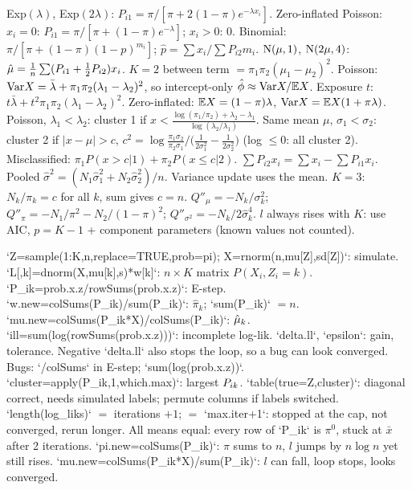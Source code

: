 \li Exp$(\lambda)$, Exp$(2\lambda)$: $P_{i1}=\pi/[\pi+2(1-\pi)e^{-\lambda x_i}]$.
\li Zero-inflated Poisson: $x_i=0$: $P_{i1}=\pi/[\pi+(1-\pi)e^{-\lambda}]$; $x_i>0$: 0. Binomial: $\pi/[\pi+(1-\pi)(1-p)^{m_i}]$; $\hat p=\sum x_i/\sum P_{i2}m_i$.
\li $\mathrm{N}(\mu,1)$, $\mathrm{N}(2\mu,4)$: $\hat{\mu}=\frac1n\sum(P_{i1}+\frac12P_{i2})x_i$.
\sk{} $K=2$ between term $=\pi_1\pi_2(\mu_1-\mu_2)^2$. Poisson: $\mathrm{Var} X=\bar\lambda+\pi_1\pi_2(\lambda_1-\lambda_2)^2$, so intercept-only $\hat{\phi}\approx\mathrm{Var} X/\mathbb{E} X$. Exposure $t$: $t\bar\lambda+t^2\pi_1\pi_2(\lambda_1-\lambda_2)^2$. Zero-inflated: $\mathbb{E} X=(1-\pi)\lambda$, $\mathrm{Var} X=\mathbb{E} X(1+\pi\lambda)$.
\sk{} Poisson, $\lambda_1<\lambda_2$: cluster 1 if $x<\frac{\log(\pi_1/\pi_2)+\lambda_2-\lambda_1}{\log(\lambda_2/\lambda_1)}$. Same mean $\mu$, $\sigma_1<\sigma_2$: cluster 2 if $|x-\mu|>c$, $c^2=\log\frac{\pi_1\sigma_2}{\pi_2\sigma_1}\big/\big(\frac1{2\sigma_1^2}-\frac1{2\sigma_2^2}\big)$ (log $\le0$: all cluster 2). Misclassified: $\pi_1P(x>c|1)+\pi_2P(x\le c|2)$.
\sk{} $\sum P_{i2}x_i=\sum x_i-\sum P_{i1}x_i$. Pooled $\hat\sigma^2=(N_1\hat\sigma_1^2+N_2\hat\sigma_2^2)/n$. Variance update uses the  mean. $K=3$: $N_k/\pi_k=c$ for all $k$, sum gives $c=n$.
\sk{} $Q''_\mu=-N_k/\sigma_k^2$; $Q''_\pi=-N_1/\pi^2-N_2/(1-\pi)^2$; $Q''_{\sigma^2}=-N_k/2\hat\sigma_k^4$.
\sk{} $l$ always rises with $K$: use AIC, $p=K-1$ + component parameters (known values not counted).
\bx
{}\par
`Z=sample(1:K,n,replace=TRUE,prob=pi); X=rnorm(n,mu[Z],sd[Z])`: simulate.
\li`L[,k]=dnorm(X,mu[k],s)*w[k]`: $n\times K$ matrix $P(X_i,Z_i{=}k)$.
\li`P_ik=prob.x.z/rowSums(prob.x.z)`: E-step.
\li`w.new=colSums(P_ik)/sum(P_ik)`: $\hat\pi_k$; `sum(P_ik)` $=n$.
\li`mu.new=colSums(P_ik*X)/colSums(P_ik)`: $\hat{\mu}_k$.
\li`ill=sum(log(rowSums(prob.x.z)))`: incomplete log-lik.
\li`delta.ll`, `epsilon`: gain, tolerance. Negative `delta.ll` also stops the loop, so a bug can look converged. Bugs: `/colSums` in E-step; `sum(log(prob.x.z))`.
\li`cluster=apply(P_ik,1,which.max)`: largest $P_{ik}$. `table(true=Z,cluster)`: diagonal correct, needs simulated labels; permute columns if labels switched.
\li`length(log_liks)` $=$ iterations $+1$; $=$ `max.iter+1`: stopped at the cap, not converged, rerun longer. All means equal: every row of `P_ik` is $\pi^0$, stuck at $\bar x$ after 2 iterations.
\li{} `pi.new=colSums(P_ik)`: $\pi$ sums to $n$, $l$ jumps by $n\log n$ yet still rises. `mu.new=colSums(P_ik*X)/sum(P_ik)`: $l$ can fall, loop stops, looks converged.
